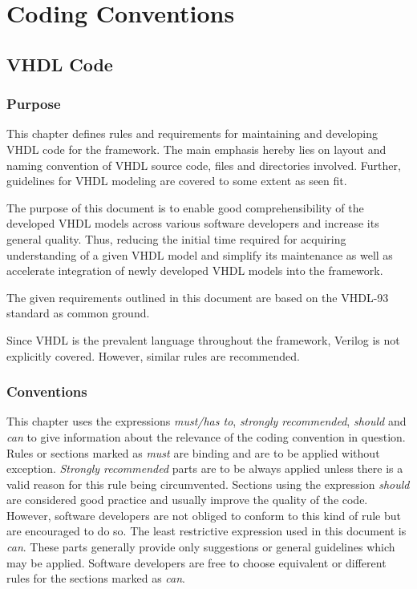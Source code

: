 \section{Coding Conventions}





\subsection{VHDL Code}



\subsubsection{Purpose}

This chapter defines rules and requirements for maintaining and developing VHDL code for the \asterics framework. The main emphasis hereby lies on layout and naming convention of VHDL source code, files and directories involved.
Further, guidelines for VHDL modeling are covered to some extent as seen fit.

The purpose of this document is to enable good comprehensibility of the developed VHDL models across various software developers and increase its general quality. Thus, reducing the initial time required for acquiring understanding of a given VHDL model and simplify its maintenance as well as accelerate integration of newly developed VHDL models into the \asterics framework.

The given requirements outlined in this document are based on the VHDL-93 standard as common ground.

Since VHDL is the prevalent language throughout the \asterics framework, Verilog is not explicitly covered. However, similar rules are recommended.


\subsubsection{Conventions}

This chapter uses the expressions \textit{must/has to}, \textit{strongly recommended}, \textit{should} and \textit{can} to give information about the relevance of the coding convention in question.
Rules or sections marked as \textit{must} are binding and are to be applied without exception.
\textit{Strongly recommended} parts are to be always applied unless there is a valid reason for this rule being circumvented.
Sections using the expression \textit{should} are considered good practice and usually improve the quality of the code.
However, software developers are not obliged to conform to this kind of rule but are encouraged to do so.
The least restrictive expression used in this document is \textit{can}.
These parts generally provide only suggestions or general guidelines which may be applied.
Software developers are free to choose equivalent or different rules for the sections marked as \textit{can}. 

